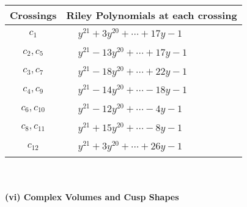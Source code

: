 \documentclass[1p]{elsarticle_modified}
\theoremstyle{definition}
\begin{document}
\begin{tabular}{m{50pt}|m{274pt}}
Crossings & \hspace{64pt}Riley Polynomials at each crossing \\
\hline $$\begin{aligned}c_{1}\end{aligned}$$&$\begin{aligned}
&y^{21}+3 y^{20}+\cdots+17 y-1
\end{aligned}$\\
\hline $$\begin{aligned}c_{2},c_{5}\end{aligned}$$&$\begin{aligned}
&y^{21}-13 y^{20}+\cdots+17 y-1
\end{aligned}$\\
\hline $$\begin{aligned}c_{3},c_{7}\end{aligned}$$&$\begin{aligned}
&y^{21}-18 y^{20}+\cdots+22 y-1
\end{aligned}$\\
\hline $$\begin{aligned}c_{4},c_{9}\end{aligned}$$&$\begin{aligned}
&y^{21}-14 y^{20}+\cdots-18 y-1
\end{aligned}$\\
\hline $$\begin{aligned}c_{6},c_{10}\end{aligned}$$&$\begin{aligned}
&y^{21}-12 y^{20}+\cdots-4 y-1
\end{aligned}$\\
\hline $$\begin{aligned}c_{8},c_{11}\end{aligned}$$&$\begin{aligned}
&y^{21}+15 y^{20}+\cdots-8 y-1
\end{aligned}$\\
\hline $$\begin{aligned}c_{12}\end{aligned}$$&$\begin{aligned}
&y^{21}+3 y^{20}+\cdots+26 y-1
\end{aligned}$\\
\hline
\end{tabular}\\~\\
\newpage\flushleft \textbf{(vi) Complex Volumes and Cusp Shapes}
\end{document}
